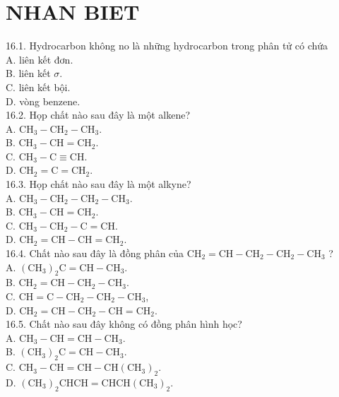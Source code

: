 \documentclass[10pt]{article}
\begin{document}
\section*{NHAN BIET}
16.1. Hydrocarbon không no là những hydrocarbon trong phân tử có chứa\\
A. liên kết đơn.\\
B. liên kết $\sigma$.\\
C. liên kết bội.\\
D. vòng benzene.\\
16.2. Họp chất nào sau đây là một alkene?\\
A. $\mathrm{CH}_{3}-\mathrm{CH}_{2}-\mathrm{CH}_{3}$.\\
B. $\mathrm{CH}_{3}-\mathrm{CH}=\mathrm{CH}_{2}$.\\
C. $\mathrm{CH}_{3}-\mathrm{C} \equiv \mathrm{CH}$.\\
D. $\mathrm{CH}_{2}=\mathrm{C}=\mathrm{CH}_{2}$.\\
16.3. Họp chất nào sau đây là một alkyne?\\
A. $\mathrm{CH}_{3}-\mathrm{CH}_{2}-\mathrm{CH}_{2}-\mathrm{CH}_{3}$.\\
B. $\mathrm{CH}_{3}-\mathrm{CH}=\mathrm{CH}_{2}$.\\
C. $\mathrm{CH}_{3}-\mathrm{CH}_{2}-\mathrm{C}=\mathrm{CH}$.\\
D. $\mathrm{CH}_{2}=\mathrm{CH}-\mathrm{CH}=\mathrm{CH}_{2}$.\\
16.4. Chất nào sau đây là đồng phân của $\mathrm{CH}_{2}=\mathrm{CH}-\mathrm{CH}_{2}-\mathrm{CH}_{2}-\mathrm{CH}_{3}$ ?\\
A. $\left(\mathrm{CH}_{3}\right)_{2} \mathrm{C}=\mathrm{CH}-\mathrm{CH}_{3}$.\\
B. $\mathrm{CH}_{2}=\mathrm{CH}-\mathrm{CH}_{2}-\mathrm{CH}_{3}$.\\
C. $\mathrm{CH}=\mathrm{C}-\mathrm{CH}_{2}-\mathrm{CH}_{2}-\mathrm{CH}_{3}$,\\
D. $\mathrm{CH}_{2}=\mathrm{CH}-\mathrm{CH}_{2}-\mathrm{CH}=\mathrm{CH}_{2}$.\\
16.5. Chất nào sau đây không có đồng phân hình học?\\
A. $\mathrm{CH}_{3}-\mathrm{CH}=\mathrm{CH}-\mathrm{CH}_{3}$.\\
B. $\left(\mathrm{CH}_{3}\right)_{2} \mathrm{C}=\mathrm{CH}-\mathrm{CH}_{3}$.\\
C. $\mathrm{CH}_{3}-\mathrm{CH}=\mathrm{CH}-\mathrm{CH}\left(\mathrm{CH}_{3}\right)_{2}$.\\
D. $\left(\mathrm{CH}_{3}\right)_{2} \mathrm{CHCH}=\mathrm{CHCH}\left(\mathrm{CH}_{3}\right)_{2}$.\\
\end{document}
